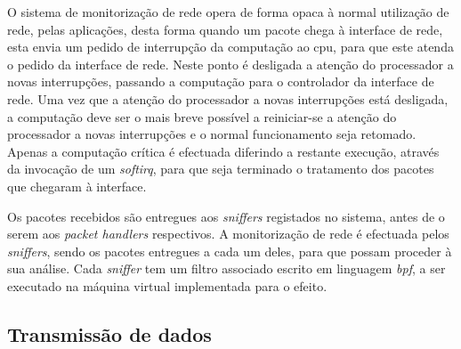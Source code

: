 

O sistema de monitorização de rede opera de forma opaca à normal utilização de rede, pelas aplicações, desta forma quando um pacote chega à interface de rede, esta envia um pedido de interrupção da computação ao cpu, para que este atenda o pedido da interface de rede.
Neste ponto é desligada a atenção do processador a novas interrupções, passando a computação para o controlador da interface de rede.
Uma vez que a atenção do processador a novas interrupções está desligada, a computação deve ser o mais breve possível a reiniciar-se a atenção do processador a novas interrupções e o normal funcionamento seja retomado.
Apenas a computação crítica é efectuada diferindo a restante execução, através da invocação de um \textit{softirq}, para que seja terminado o tratamento dos pacotes que chegaram à interface.

Os pacotes recebidos são entregues aos \textit{sniffers} registados no sistema, antes de o serem aos \textit{packet handlers} respectivos.
A monitorização de rede é efectuada pelos \textit{sniffers}, sendo os pacotes entregues a cada um deles, para que possam proceder à sua análise.
Cada \textit{sniffer} tem um filtro associado escrito em linguagem \textit{bpf}, a ser executado na máquina virtual implementada para o efeito.




\subsection{Transmissão de dados}

